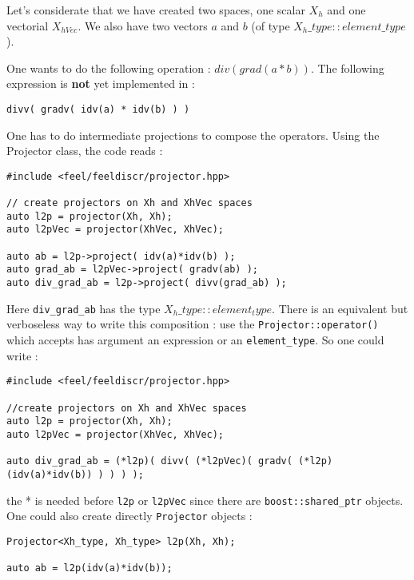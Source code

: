 Let's considerate that we have created two spaces, one scalar $X_h$ and one vectorial $X_{hVec}$. We also have two vectors $a$ and $b$ (of type $X_{h}\_type::element\_type$).

One wants to do the following operation : $div( grad(a*b))$. The following expression is \textbf{not} yet implemented in \feel :
\begin{lstlisting}
divv( gradv( idv(a) * idv(b) ) )
\end{lstlisting}
One has to do intermediate projections to compose the operators. Using the Projector class, the code reads :
\begin{lstlisting}
#include <feel/feeldiscr/projector.hpp>

// create projectors on Xh and XhVec spaces
auto l2p = projector(Xh, Xh);
auto l2pVec = projector(XhVec, XhVec);

auto ab = l2p->project( idv(a)*idv(b) );
auto grad_ab = l2pVec->project( gradv(ab) );
auto div_grad_ab = l2p->project( divv(grad_ab) );
\end{lstlisting}
Here \lstinline!div_grad_ab! has the type $X_{h}\_type::element_type$. There is an equivalent but verboseless way to write this composition : use the \lstinline!Projector::operator()! which accepts has argument an expression or an \lstinline!element_type!. So one could write :
\begin{lstlisting}
#include <feel/feeldiscr/projector.hpp>

//create projectors on Xh and XhVec spaces
auto l2p = projector(Xh, Xh);
auto l2pVec = projector(XhVec, XhVec);

auto div_grad_ab = (*l2p)( divv( (*l2pVec)( gradv( (*l2p)(idv(a)*idv(b)) ) ) ) );
\end{lstlisting}
the * is needed before \lstinline!l2p! or \lstinline!l2pVec! since there are \lstinline!boost::shared_ptr! objects. One could also create directly \lstinline!Projector! objects :
\begin{lstlisting}
Projector<Xh_type, Xh_type> l2p(Xh, Xh);

auto ab = l2p(idv(a)*idv(b));
\end{lstlisting}



